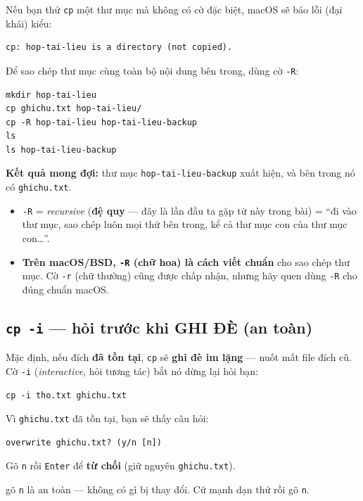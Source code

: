 \documentclass[12pt,a4paper]{article}
\newcommand{\cmd}[1]{\texttt{#1}}
\begin{document}
Nếu bạn thử \cmd{cp} một thư mục mà không có cờ đặc biệt, macOS sẽ báo lỗi (đại khái) kiểu:
\begin{Verbatim}
cp: hop-tai-lieu is a directory (not copied).
\end{Verbatim}
Để sao chép thư mục cùng toàn bộ nội dung bên trong, dùng cờ \cmd{-R}:

\begin{Verbatim}
mkdir hop-tai-lieu
cp ghichu.txt hop-tai-lieu/
cp -R hop-tai-lieu hop-tai-lieu-backup
ls
ls hop-tai-lieu-backup
\end{Verbatim}

\textbf{Kết quả mong đợi:} thư mục \cmd{hop-tai-lieu-backup} xuất hiện, và bên trong nó có \cmd{ghichu.txt}.

\begin{itemize}[leftmargin=1.4em]
\item \cmd{-R} = \textit{recursive} (\textbf{đệ quy} --- đây là lần đầu ta gặp từ này trong bài) = ``đi vào thư mục, sao chép luôn mọi thứ bên trong, kể cả thư mục con của thư mục con\ldots''.
\item \textbf{Trên macOS/BSD, \cmd{-R} (chữ hoa) là cách viết chuẩn} cho sao chép thư mục. Cờ \cmd{-r} (chữ thường) cũng được chấp nhận, nhưng hãy quen dùng \cmd{-R} cho đúng chuẩn macOS.
\end{itemize}

\subsection{\texttt{cp -i} --- hỏi trước khi GHI ĐÈ (an toàn)}

Mặc định, nếu đích \textbf{đã tồn tại}, \cmd{cp} sẽ \textbf{ghi đè im lặng} --- nuốt mất file đích cũ. Cờ \cmd{-i} (\textit{interactive}, hỏi tương tác) bắt nó dừng lại hỏi bạn:

\begin{Verbatim}
cp -i tho.txt ghichu.txt
\end{Verbatim}

Vì \cmd{ghichu.txt} đã tồn tại, bạn sẽ thấy câu hỏi:
\begin{Verbatim}
overwrite ghichu.txt? (y/n [n])
\end{Verbatim}

Gõ \cmd{n} rồi \cmd{Enter} để \textbf{từ chối} (giữ nguyên \cmd{ghichu.txt}).

\begin{notebox}[title={Trấn an}]
gõ \cmd{n} là an toàn --- không có gì bị thay đổi. Cứ mạnh dạn thử rồi gõ \cmd{n}.
\end{notebox}
\end{document}
